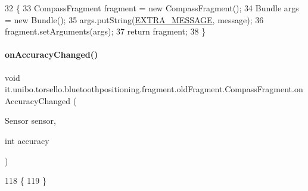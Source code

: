 \begin{DoxyCode}
32                                                               \{
33         CompassFragment fragment = \textcolor{keyword}{new} CompassFragment();
34         Bundle args = \textcolor{keyword}{new} Bundle();
35         args.putString(\hyperlink{classit_1_1unibo_1_1torsello_1_1bluetoothpositioning_1_1fragment_1_1oldFragment_1_1CompassFragment_aa984dd2435af48bbcb21cafa07f8e16a_aa984dd2435af48bbcb21cafa07f8e16a}{EXTRA\_MESSAGE}, message);
36         fragment.setArguments(args);
37         \textcolor{keywordflow}{return} fragment;
38     \}
\end{DoxyCode}
\hypertarget{classit_1_1unibo_1_1torsello_1_1bluetoothpositioning_1_1fragment_1_1oldFragment_1_1CompassFragment_a72278751498e147f3d18234c884b0490_a72278751498e147f3d18234c884b0490}{}\label{classit_1_1unibo_1_1torsello_1_1bluetoothpositioning_1_1fragment_1_1oldFragment_1_1CompassFragment_a72278751498e147f3d18234c884b0490_a72278751498e147f3d18234c884b0490} 
\paragraph{\texorpdfstring{on\+Accuracy\+Changed()}{onAccuracyChanged()}}
{\footnotesize\ttfamily void it.\+unibo.\+torsello.\+bluetoothpositioning.\+fragment.\+old\+Fragment.\+Compass\+Fragment.\+on\+Accuracy\+Changed (\begin{DoxyParamCaption}\item[{Sensor}]{sensor,  }\item[{int}]{accuracy }\end{DoxyParamCaption})}


\begin{DoxyCode}
118                                                                \{
119     \}
\end{DoxyCode}
\hypertarget{classit_1_1unibo_1_1torsello_1_1bluetoothpositioning_1_1fragment_1_1oldFragment_1_1CompassFragment_aa5fc14a2e767999f225aa4d4b2bff424_aa5fc14a2e767999f225aa4d4b2bff424}{}\label{classit_1_1unibo_1_1torsello_1_1bluetoothpositioning_1_1fragment_1_1oldFragment_1_1CompassFragment_aa5fc14a2e767999f225aa4d4b2bff424_aa5fc14a2e767999f225aa4d4b2bff424} 
